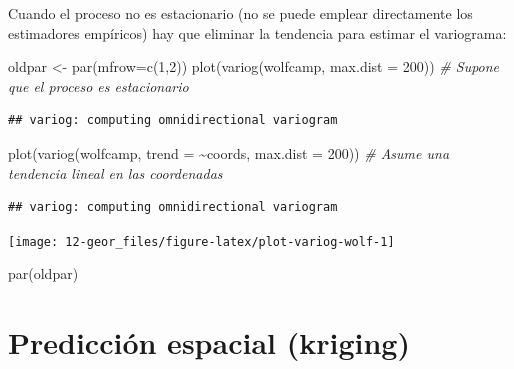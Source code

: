 \documentclass[
  spanish,
]{book}
\newenvironment{Shaded}{\begin{snugshade}}{\end{snugshade}}
\newcommand{\AttributeTok}[1]{\textcolor[rgb]{0.77,0.63,0.00}{#1}}
\newcommand{\CommentTok}[1]{\textcolor[rgb]{0.56,0.35,0.01}{\textit{#1}}}
\newcommand{\DecValTok}[1]{\textcolor[rgb]{0.00,0.00,0.81}{#1}}
\newcommand{\FunctionTok}[1]{\textcolor[rgb]{0.00,0.00,0.00}{#1}}
\newcommand{\NormalTok}[1]{#1}
\newcommand{\OtherTok}[1]{\textcolor[rgb]{0.56,0.35,0.01}{#1}}
\newcommand{\SpecialCharTok}[1]{\textcolor[rgb]{0.00,0.00,0.00}{#1}}
\theoremstyle{break}
\theoremstyle{definition}
\theoremstyle{definition}
\theoremstyle{definition}
\theoremstyle{definition}
\theoremstyle{remark}
\begin{document}
Cuando el proceso no es estacionario (no se puede emplear directamente los
estimadores empíricos) hay que eliminar la tendencia para estimar el variograma:

\begin{Shaded}
\begin{Highlighting}[]
\NormalTok{oldpar }\OtherTok{\textless{}{-}} \FunctionTok{par}\NormalTok{(}\AttributeTok{mfrow=}\FunctionTok{c}\NormalTok{(}\DecValTok{1}\NormalTok{,}\DecValTok{2}\NormalTok{)) }
\FunctionTok{plot}\NormalTok{(}\FunctionTok{variog}\NormalTok{(wolfcamp, }\AttributeTok{max.dist =} \DecValTok{200}\NormalTok{)) }\CommentTok{\# Supone que el proceso es estacionario}
\end{Highlighting}
\end{Shaded}

\begin{verbatim}
## variog: computing omnidirectional variogram
\end{verbatim}

\begin{Shaded}
\begin{Highlighting}[]
\FunctionTok{plot}\NormalTok{(}\FunctionTok{variog}\NormalTok{(wolfcamp, }\AttributeTok{trend =} \SpecialCharTok{\textasciitilde{}}\NormalTok{coords, }\AttributeTok{max.dist =} \DecValTok{200}\NormalTok{)) }\CommentTok{\# Asume una tendencia lineal en las coordenadas}
\end{Highlighting}
\end{Shaded}

\begin{verbatim}
## variog: computing omnidirectional variogram
\end{verbatim}

\begin{center}\texttt{[image: 12-geor\_files/figure-latex/plot-variog-wolf-1]} \end{center}

\begin{Shaded}
\begin{Highlighting}[]
\FunctionTok{par}\NormalTok{(oldpar)}
\end{Highlighting}
\end{Shaded}

\hypertarget{predicciuxf3n-espacial-kriging}{%
\section{Predicción espacial (kriging)}\label{predicciuxf3n-espacial-kriging}}
\end{document}

